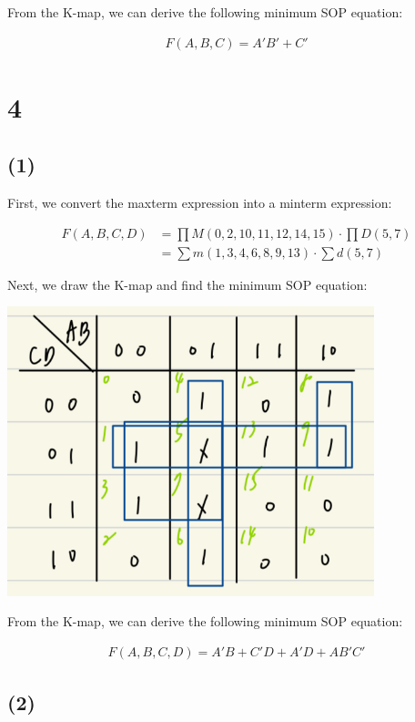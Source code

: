 \documentclass{article}
\begin{document}
From the K-map, we can derive the following minimum SOP equation:

\begin{align*}
    F(A, B, C) = A'B' + C'
\end{align*}
\newpage

\section*{4}

\subsection*{(1)}

First, we convert the maxterm expression into a minterm expression:

\begin{align*}
    F(A, B, C, D) 
    &= \prod M(0, 2, 10, 11, 12, 14, 15) \cdot \prod D(5, 7) \\
    &= \sum m(1, 3, 4, 6, 8, 9, 13) \cdot \sum d(5, 7)
\end{align*}

Next, we draw the K-map and find the minimum SOP equation:

\begin{center}
    \includegraphics[width=0.8\textwidth]{HW2_4(1)_KMap}
\end{center}

From the K-map, we can derive the following minimum SOP equation:

\begin{align*}
    F(A, B, C, D) = A'B + C'D + A'D + AB'C'
\end{align*}
\newpage

\subsection*{(2)}
\end{document}
